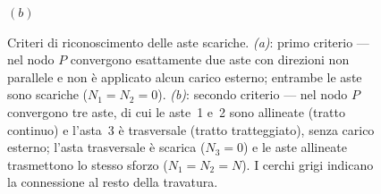 \begin{figure}[htbp]
\begin{minipage}[t]{0.48\textwidth}
		\par\smallskip$(b)$
	\end{minipage}
	\caption{Criteri di riconoscimento delle aste scariche.
		\emph{(a)}: primo criterio --- nel nodo $P$ convergono
		esattamente due aste con direzioni non parallele e non
		è applicato alcun carico esterno; entrambe le aste
		sono scariche ($N_1 = N_2 = 0$).
		\emph{(b)}: secondo criterio --- nel nodo $P$
		convergono tre aste, di cui le aste~1 e~2 sono
		allineate (tratto continuo) e l'asta~3 è trasversale
		(tratto tratteggiato), senza carico esterno; l'asta
		trasversale è scarica ($N_3 = 0$) e le aste allineate
		trasmettono lo stesso sforzo ($N_1 = N_2 = N$).
		I cerchi grigi indicano la connessione al resto
		della travatura.}
	\label{fig:aste_scariche}
\end{figure}
